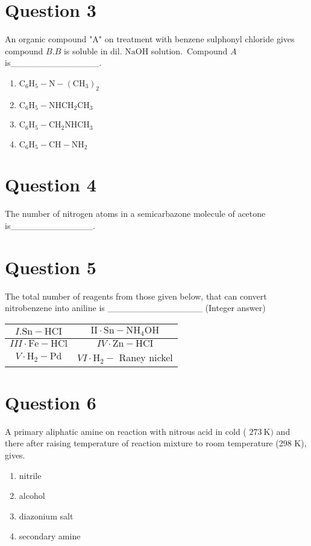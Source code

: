 \documentclass{article}
\begin{document}
\section*{Question 3}
An organic compound "A" on treatment with benzene sulphonyl chloride gives compound \(B . B\) is soluble in dil. \(\mathrm{NaOH}\) solution. Compound \(A\) is______________. 
\begin{enumerate}[label=(\alph*)]
\item \(\mathrm{C}_6 \mathrm{H}_5-\mathrm{N}-\left(\mathrm{CH}_3\right)_2\)
\item \(\mathrm{C}_6 \mathrm{H}_5-\mathrm{NHCH}_2 \mathrm{CH}_3\)
\item \(\mathrm{C}_6 \mathrm{H}_5-\mathrm{CH}_2 \mathrm{NHCH}_3\)
\item \(\mathrm{C}_6 \mathrm{H}_5-\mathrm{CH}-\mathrm{NH}_2\)
\end{enumerate}
\newpage
\section*{Question 4}
The number of nitrogen atoms in a semicarbazone molecule of acetone is_____________.
\begin{enumerate}[label=(\alph*)]
\end{enumerate}
\newpage
\section*{Question 5}
The total number of reagents from those given below, that can convert nitrobenzene into aniline is _______________ (Integer answer)
    \setlength{\arrayrulewidth}{0.8mm}
    \begin{tabular}{|c|c|}
    \hline
    \(I . \mathrm{Sn}-\mathrm{HCI}\) & \(\mathrm{II} \cdot \mathrm{Sn}-\mathrm{NH}_4 \mathrm{OH}\) \\
\hline
\(I I I \cdot \mathrm{Fe}-\mathrm{HCl}\) & \(I V \cdot \mathrm{Zn}-\mathrm{HCI}\) \\
\hline
\(V \cdot \mathrm{H}_2-\mathrm{Pd}\) & \(V I \cdot \mathrm{H}_2-\) Raney nickel \\
\hline

    \end{tabular}
    \setlength{\arrayrulewidth}{0.4mm}
    
\begin{enumerate}[label=(\alph*)]
\end{enumerate}
\newpage
\section*{Question 6}
A primary aliphatic amine on reaction with nitrous acid in cold ( \(273 \mathrm{~K})\) and there after raising temperature of reaction mixture to room temperature (298 K), gives.
\begin{enumerate}[label=(\alph*)]
\item nitrile
\item alcohol
\item diazonium salt
\item secondary amine
\end{enumerate}
\newpage
\end{document}
